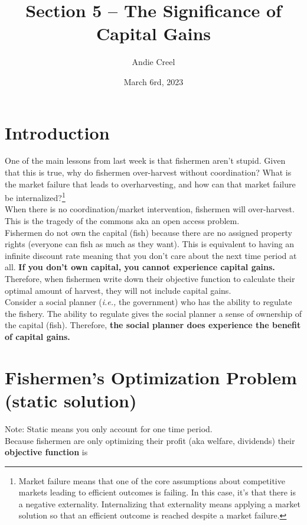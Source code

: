 \documentclass[12pt]{article}
\title{Section 5 -- The Significance of Capital Gains}
\author{Andie Creel}
\date{March 6rd, 2023}
\begin{document}
\maketitle

\section{Introduction}
One of the main lessons from last week is that fishermen aren't stupid. Given that this is true, why do fishermen over-harvest without coordination? What is the market failure that leads to overharvesting, and how can that market failure be internalized?\footnote{Market failure means that one of the core assumptions about competitive markets leading to efficient outcomes is failing. In this case, it's that there is a negative externality. Internalizing that externality means applying a market solution so that an efficient outcome is reached despite a market failure.}\\

When there is no coordination/market intervention, fishermen will over-harvest. This is the tragedy of the commons aka an open access problem. \\

Fishermen do not own the capital (fish) because there are no assigned property rights (everyone can fish as much as they want). This is equivalent to having an infinite discount rate meaning that you don't care about the next time period at all. \textbf{If you don't own capital, you cannot experience capital gains.} Therefore, when fishermen write down their objective function to calculate their optimal amount of harvest, they will not include capital gains. \\

Consider a social planner (\textit{i.e.,} the government) who has the ability to regulate the fishery. The ability to regulate gives the social planner a sense of ownership of the capital (fish). Therefore, \textbf{the social planner does experience the benefit of capital gains. }

\section{Fishermen's Optimization Problem (static solution)}
Note: Static means you only account for one time period.\\

Because fishermen are only optimizing their profit (aka welfare, dividends) their \textbf{objective function} is 
\end{document}
